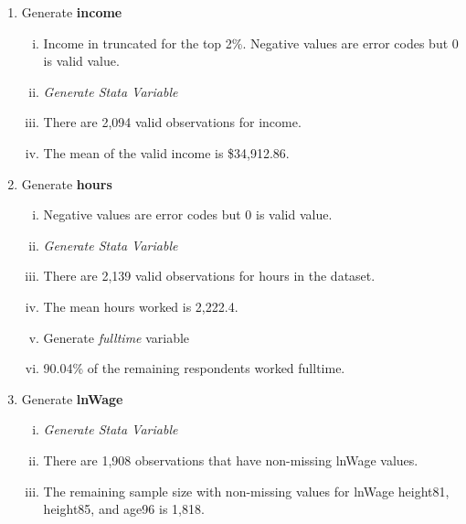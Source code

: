 \documentclass[12pt]{article}
\begin{document}
\begin{enumerate}[\indent a.]
    \item Generate \textbf{income}
    \begin{enumerate}[(i)]
        \item Income in truncated for the top 2\%. Negative values are error 
        codes but 0 is valid value.

        \item \textit{Generate Stata Variable}
        
        \item There are 2,094 valid observations for income.
        
        \item  The mean of the valid income is \$34,912.86.
    \end{enumerate}

    \item Generate \textbf{hours}
    \begin{enumerate}[(i)]
        \item Negative values are error codes but 0 is valid value.
        
        \item \textit{Generate Stata Variable}
        
        \item There are 2,139 valid observations for hours in the dataset.
        
        \item The mean hours worked is 2,222.4.
        
        \item Generate \textit{fulltime} variable 

        \item 90.04\% of the remaining respondents worked fulltime.
    \end{enumerate} 

    \item Generate \textbf{lnWage}
    \begin{enumerate}[(i)]
        \item \textit{Generate Stata Variable}
        
        \item There are 1,908 observations that have non-missing lnWage values.
        
        \item The remaining sample size with non-missing values for lnWage 
        height81, height85, and age96 is 1,818.
    \end{enumerate}


\end{enumerate}
\end{document}
